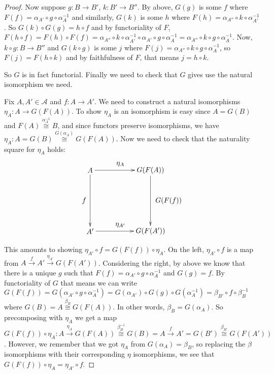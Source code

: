 \documentclass[11pt]{article}
\theoremstyle{definition}
\theoremstyle{plain}
\theoremstyle{plain}
\theoremstyle{plain}
\begin{document}
\begin{proof}
Now suppose $g:B \to B'$, $k:B' \to B''$. By above, $G(g)$ is some $f$ where $F(f) = \alpha_{A'} \circ g \circ \alpha_{A}^{-1}$ and similarly, $G(k)$ is some $h$ where $F(h) = \alpha_{A''} \circ k \circ \alpha_{A'}^{-1}$. So $G(k) \circ G(g) = h \circ f$ and by functoriality of $F$, $F(h \circ f) = F(h) \circ F(f)= \alpha_{A''} \circ k \circ \alpha_{A'}^{-1} \circ \alpha_{A'} \circ g \circ \alpha_{A}^{-1} = \alpha_{A''} \circ k \circ g \circ \alpha_{A}^{-1}$. Now, $k \circ g: B \to B''$ and $G(k \circ g)$ is some $j$ where $F(j)=\alpha_{A''} \circ k \circ g \circ \alpha_{A}^{-1}$, so $F(j)=F(h \circ k)$ and by faithfulness of $F$, that means $j=h \circ k$.

So $G$ is in fact functorial. Finally we need to check that $G$ gives use the natural isomorphism we need.

Fix $A,A'\in\mathscr{A}$ and $f:A \to A'$. We need to construct a natural isomorphisms $\eta_{A}:A \to G(F(A))$. To show $\eta_{A}$ is an isomorphism is easy since $A=G(B)$ and $F(A) \overset{\alpha_{A}^{-1}}{\cong}B$, and since functors preserve isomorphisms, we have $\eta_{A}: A = G(B) \overset{G(\alpha_{A})}{\cong} G(F(A))$. Now we need to check that the naturality square for $\eta_{A}$ holds:

\begin{equation*}
\begin{xy}
(0,0)*+{A}="a"; (30,0)*+{G(F(A))}="gfa";%
(0,-30)*+{A'}="ap"; (30,-30)*+{G(F(A'))}="gfap";
{\ar "a"; "gfa"}?*!/_3mm/{\eta_{A}};
{\ar "a"; "ap"}?*!/^3mm/{f};
{\ar "ap"; "gfap"}?*!/_3mm/{\eta_{A'}};
{\ar "gfa";"gfap"}?*!/_9mm/{G(F(f))};
\end{xy}
\end{equation*}

This amounts to showing $\eta_{A'} \circ f = G(F(f)) \circ \eta_{A}$. On the left, $\eta_{A'} \circ f$ is a map from $A \overset{f}{\rightarrow} A' \overset{\eta_{A'}}{\rightarrow} G(F(A'))$. Considering the right, by above we know that there is a unique $g$ such that $F(f)=\alpha_{A'} \circ g \circ \alpha_{A}^{-1}$ and $G(g)=f$. By functoriality of $G$ that means we can write $G(F(f))=G(\alpha_{A'} \circ g \circ \alpha_{A}^{-1}) = G(\alpha_{A'}) \circ G(g) \circ G(\alpha_{A}^{-1}) = \beta_{B'} \circ f \circ \beta_{B}^{-1}$ where $G(B)=A \overset{\beta_{B}}{\cong} G(F(A))$. In other words, $\beta_{B}=G(\alpha_{A})$. So precomposing with $\eta_{A}$ we get a map $G(F(f)) \circ \eta_{A}: A \overset{\eta_{A}}{\rightarrow} G(F(A)) \overset{\beta_{B}^{-1}}{\cong} G(B) = A \overset{f}{\rightarrow} A' = G(B') \overset{\beta_{B'}}{\cong} G(F(A'))$. However, we remember that we got $\eta_{A}$ from $G(\alpha_{A})=\beta_{B}$, so replacing the $\beta$ isomorphisms with their corresponding $\eta$ isomorphisms, we see that $G(F(f)) \circ \eta_{A} = \eta_{A'} \circ f$.


\end{proof}
\end{document}
